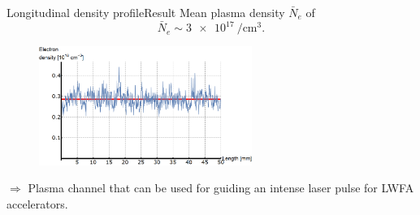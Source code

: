 \documentclass[dvipsnames]{beamer}
\begin{document}
\begin{frame}{Longitudinal density profile}{Result}
 Mean plasma density $\bar{N}_e$ of
 \begin{equation*}
     \bar{N}_e \sim \SI{3e17}{\per\cubic\cm}.
 \end{equation*}
\begin{figure}
   \includegraphics[height=110pt]{figures/results/spectro/longitudinal_profile.png}
\end{figure}

 $\Rightarrow$ Plasma channel that can be used for guiding an intense laser pulse for LWFA accelerators.
\end{frame}
\end{document}
